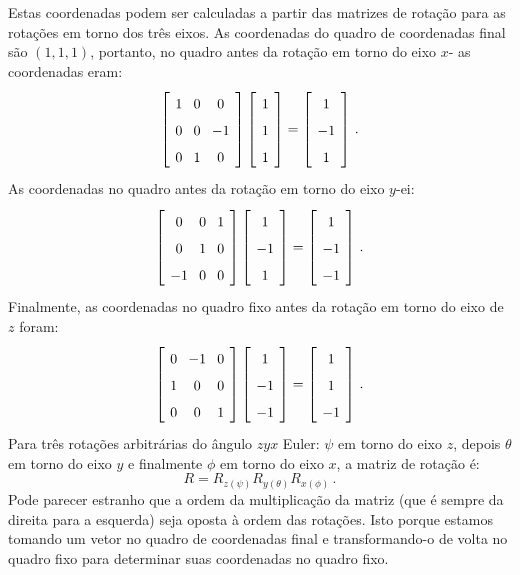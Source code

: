 Estas coordenadas podem ser calculadas a partir das matrizes de rotação para as rotações em torno dos três eixos. As coordenadas do quadro de coordenadas final são $(1,1,1)$, portanto, no quadro antes da rotação em torno do eixo $x$- as coordenadas eram:
\[
\spacearray
\left[\begin{array}{ccc}1&0&0\\0&0&-1\\0&1&0\\\end{array}\right]
\left[\begin{array}{c}1\\1\\1\end{array}\right]=
\left[\begin{array}{c}1\\-1\\1\end{array}\right]\,.
\]
As coordenadas no quadro antes da rotação em torno do eixo $y$-ei:
\[
\spacearray
\left[\begin{array}{ccc}0&0&1\\0&1&0\\-1&0&0\\\end{array}\right]
\left[\begin{array}{c}1\\-1\\1\end{array}\right]=
\left[\begin{array}{c}1\\-1\\-1\end{array}\right]\,.
\]
Finalmente, as coordenadas no quadro fixo antes da rotação em torno do eixo de $z$ foram:
\[
\spacearray
\left[\begin{array}{ccc}0&-1&0\\1&0&0\\0&0&1\\\end{array}\right]
\left[\begin{array}{c}1\\-1\\-1\end{array}\right]=
\left[\begin{array}{c}1\\1\\-1\end{array}\right]\,.
\]
Para três rotações arbitrárias do ângulo $zyx$ Euler: $\psi$ em torno do eixo $z$, depois $\theta$ em torno do eixo $y$ e finalmente $\phi$ em torno do eixo $x$, a matriz de rotação é:
\[
R=R_{z(\psi)}R_{y(\theta)}R_{x(\phi)}\,.
\]
Pode parecer estranho que a ordem da multiplicação da matriz (que é sempre da direita para a esquerda) seja oposta à ordem das rotações. Isto porque estamos tomando um vetor no quadro de coordenadas final e transformando-o de volta no quadro fixo para determinar suas coordenadas no quadro fixo.

